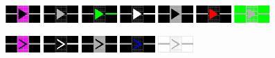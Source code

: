 \documentclass[12pt,a4paper]{article}
\begin{document}
\begin{enumerate}[leftmargin=*]
\includegraphics[width=0.1\textwidth]{symboly/hlnav16.png}
\includegraphics[width=0.1\textwidth]{symboly/hlnav1.png}
\includegraphics[width=0.1\textwidth]{symboly/hlnav2.png}
\includegraphics[width=0.1\textwidth]{symboly/hlnav3.png}
\includegraphics[width=0.1\textwidth]{symboly/hlnav5.png}
\includegraphics[width=0.1\textwidth]{symboly/hlnav6.png}
\includegraphics[width=0.1\textwidth]{symboly/hlnav8.png}

\includegraphics[width=0.1\textwidth]{symboly/senav6.png}
\includegraphics[width=0.1\textwidth]{symboly/senav2.png}
\includegraphics[width=0.1\textwidth]{symboly/senav3.png}
\includegraphics[width=0.1\textwidth]{symboly/senav4.png}
\includegraphics[width=0.1\textwidth]{symboly/senav8.png}


\end{enumerate}
\end{document}
